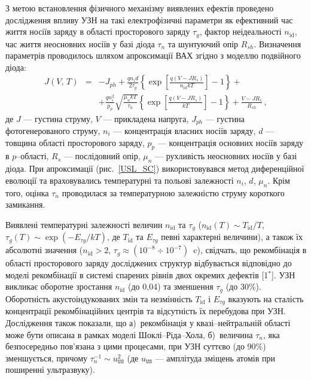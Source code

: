 З метою встановлення фізичного механізму виявлених ефектів проведено дослідження впливу УЗН на такі електрофізичні параметри як
ефективний час життя носіїв заряду в області просторового заряду $\tau_{g}$,
фактор неідеальності $n_\mathrm{id}$,
час життя неосновних носіїв у базі діода $\tau_n$
та шунтуючий опір $R_{sh}$.
Визначення параметрів проводилось шляхом апроксимації ВАХ згідно з моделлю подвійного діода:
\begin{eqnarray}
\label{eqSSCIV}
\nonumber J(V,\,T)&=&-J_{ph}+\frac{qn_id}{2\tau_{g}}\left\{\exp \left[\frac{q(V-JR_s)}{n_\mathrm{id}kT}\right]-1\right\}+\\
&&+\frac{qn_i^2}{p_p}\sqrt{\frac{\mu_nkT}{\tau_n}}\left\{\exp \left[\frac{q(V-JR_s)}{kT}\right]-1\right\}+\frac{V-JR_s}{R_{sh}}\,,
\end{eqnarray}
де
$J$ --- густина струму,
$V$ --- прикладена напруга,
$J_{ph}$ --- густина фотогенерованого струму,
$n_i$ --- концентрація власних носіїв заряду,
$d$ --- товщина області просторового заряду,
$p_p$ --- концентрація основних носіїв заряду в $p$--області,
$R_s$ --- послідовний опір,
$\mu_n$ --- рухливість неосновних носіїв у базі діода.
При апроксимації (рис.~\ref{USL_SC}) використовувався метод диференційної еволюції та враховувались температурні та польові залежності $n_i$, $d$, $\mu_n$.
Крім того, оцінка $\tau_n$ проводилася за температурною залежністю струму короткого замикання.

Виявлені температурні залежності величин $n_\mathrm{id}$ та $\tau_g$
($n_{\mathrm{id}}(T) \sim T_{\mathrm{id}}/T$,
$\tau_{g}(T)\sim\exp\left(-E_{\tau g}/kT\right)$,
де $T_{\mathrm{id}}$ та $E_{\tau g}$ певні характерні величини),
а також їх абсолютні значення ($n_{\mathrm{id}}>2$, $\tau_{g}\approx(10^{-8}\div10^{-7})$~c),
свідчать, що рекомбінація в області просторового заряду досліджених структур
відбувається відповідно до
моделі рекомбінації в системі спарених рівнів двох окремих дефектів
[1$^*$].
УЗН викликає оборотне зростання $n_\mathrm{id}$  (до 0,04) та зменшення $\tau_g$ (до 30\%).
Оборотність акустоіндукованих змін та незмінність $T_{\mathrm{id}}$ і $E_{\tau g}$
вказують на
сталість концентрації рекомбінаційних центрів та відсутність їх перебудова при УЗН.
Дослідження також показали, що
а)~рекомбінація у квазі--нейтральній області може бути описана в рамках моделі Шоклі--Ріда--Хола,
б)~величина $\tau_n$, яка безпосередньо пов'язана з цими процесами,
при УЗН суттєво (до 90\%) зменшується,
причому
$\tau_{n}^{-1}\sim u_\mathtt{US}^2$ (де $u_\mathtt{US}$ --- амплітуда зміщень атомів при поширенні ультразвуку).

